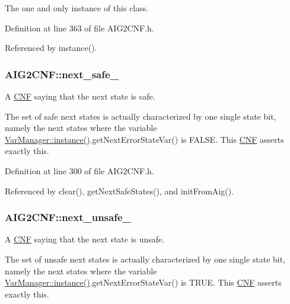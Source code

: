 The one and only instance of this class. 



Definition at line 363 of file A\-I\-G2\-C\-N\-F.\-h.



Referenced by instance().

\hypertarget{classAIG2CNF_a057c6a3159253267c99f115b7d724ee2}{
\subsubsection[{next\-\_\-safe\-\_\-}]{ A\-I\-G2\-C\-N\-F\-::next\-\_\-safe\-\_\-\hspace{0.3cm}{\ttfamily [protected]}}}\label{classAIG2CNF_a057c6a3159253267c99f115b7d724ee2}


A \hyperlink{classCNF}{C\-N\-F} saying that the next state is safe. 

The set of safe next states is actually characterized by one single state bit, namely the next states where the variable \hyperlink{classVarManager_ac1a84b367c26dfc5ee9e612f7d61b288}{Var\-Manager\-::instance()}.get\-Next\-Error\-State\-Var() is F\-A\-L\-S\-E. This \hyperlink{classCNF}{C\-N\-F} asserts exactly this. 

Definition at line 300 of file A\-I\-G2\-C\-N\-F.\-h.



Referenced by clear(), get\-Next\-Safe\-States(), and init\-From\-Aig().

\hypertarget{classAIG2CNF_a0430b9b4ff38a7b0ae339fb0abd191c9}{
\subsubsection[{next\-\_\-unsafe\-\_\-}]{ A\-I\-G2\-C\-N\-F\-::next\-\_\-unsafe\-\_\-\hspace{0.3cm}{\ttfamily [protected]}}}\label{classAIG2CNF_a0430b9b4ff38a7b0ae339fb0abd191c9}


A \hyperlink{classCNF}{C\-N\-F} saying that the next state is unsafe. 

The set of unsafe next states is actually characterized by one single state bit, namely the next states where the variable \hyperlink{classVarManager_ac1a84b367c26dfc5ee9e612f7d61b288}{Var\-Manager\-::instance()}.get\-Next\-Error\-State\-Var() is T\-R\-U\-E. This \hyperlink{classCNF}{C\-N\-F} asserts exactly this. 

